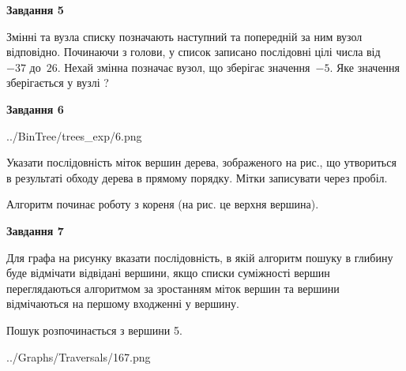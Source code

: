 \documentclass[12pt, ukrainian]{article}
\begin{document}
{\begin {large}
{\begin {center}\textbf{Завдання 5}\end {center}}\par
Змінні  та  вузла списку позначають наступний та попередній за ним вузол відповідно. Починаючи з голови, у список записано послідовні цілі числа від~$-37$ до~$26$. Нехай змінна  позначає вузол, що зберігає значення~$-5$.
Яке значення зберігається у вузлі  ?\par
\newpage

{\begin {center}\textbf{Завдання 6}\end {center}}\par

\begin{center}
	{../BinTree/trees_exp/6.png}
\end{center}
Указати послідовність міток вершин дерева, зображеного на рис., що утвориться в результаті обходу дерева в прямому порядку. Мітки записувати через пробіл.\par Алгоритм починає роботу з кореня (на рис. це верхня вершина).\par
\newpage

{\begin {center}\textbf{Завдання 7}\end {center}}\par
Для графа на рисунку вказати послідовність, в якій алгоритм пошуку в глибину буде відмічати відвідані вершини, якщо списки суміжності вершин переглядаються алгоритмом за зростанням міток вершин та вершини відмічаються на першому вход\-женні у вершину.\par
Пошук розпочинається з вершини 5.\par

\begin{center}
	{../Graphs/Traversals/167.png}
\end{center}\par
\newpage


\end{large}}
\end{document}
